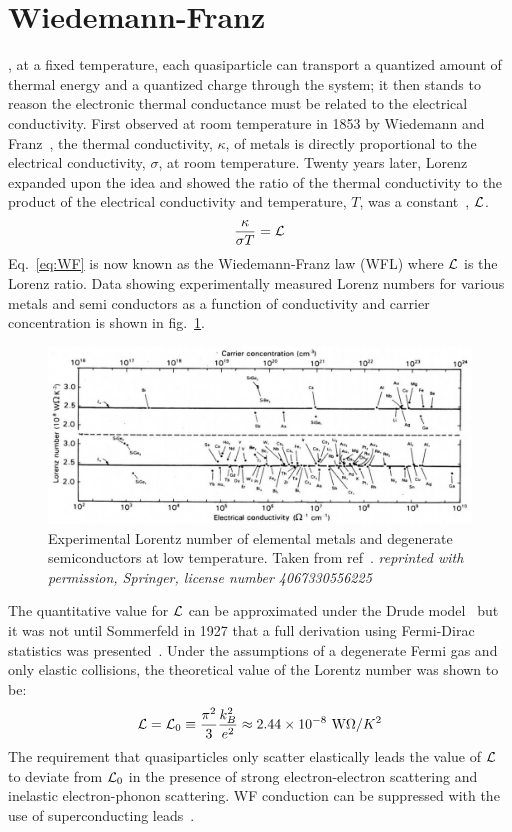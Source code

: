 \section{Wiedemann-Franz}
, at a fixed temperature, each quasiparticle can transport a quantized amount of thermal energy and a quantized charge through the system; it then stands to reason the electronic thermal conductance must be related to the electrical conductivity. First observed at room temperature in 1853 by Wiedemann and Franz~\cite{franz_ueber_1853},  the thermal conductivity, $\kappa$, of metals is directly proportional to the electrical conductivity, $\sigma$, at room temperature. Twenty years later, Lorenz expanded upon the idea and showed the ratio of the thermal conductivity to the product of the electrical conductivity and temperature, $T$, was a constant~\cite{lorenz_bestimmung_1872}, $\mathcal{L}$.
\begin{equation}\label{eq:WF}
\frac{\kappa}{\sigma T} = \mathcal{L}
\end{equation}
Eq.~\ref{eq:WF} is now known as the Wiedemann-Franz law (WFL) where $\mathcal{L}$ is the Lorenz ratio. Data showing experimentally measured Lorenz numbers for various metals and semi conductors as a function of conductivity and carrier concentration is shown in fig.~\ref{fig:WF_in_metals}.
\begin{figure}
\centering
\includegraphics[width=\textwidth]{figures/electronic_cooling/WF_in_metals.png}
\caption{Experimental Lorentz number of elemental metals and degenerate semiconductors at low temperature. Taken from ref~\cite{kumar_experimental_1993}. \textit{reprinted with permission, Springer, license number 4067330556225}}
\label{fig:WF_in_metals}
\end{figure}
The quantitative value for $\mathcal{L}$ can be approximated under the Drude model~\cite{ashcroft_solid_1976} but it was not until Sommerfeld in 1927 that a full derivation using Fermi-Dirac statistics was presented~\cite{sommerfeld}. Under the assumptions of a degenerate Fermi gas and only elastic collisions, the theoretical value of the Lorentz number was shown to be:
\begin{equation}
\mathcal{L} = \mathcal{L}_0 \equiv \frac{\pi^2}{3}\frac{k_B^2}{e^2} \approx 2.44\times10^{-8}~\mathrm{W}\Omega/K^2
\end{equation}
The requirement that quasiparticles only scatter elastically leads the value of $\mathcal{L}$ to deviate from $\mathcal{L}_0$ in the presence of strong electron-electron scattering and inelastic electron-phonon scattering. WF conduction can be suppressed with the use of superconducting leads~\cite{mckitterick_prospects_2015}.

